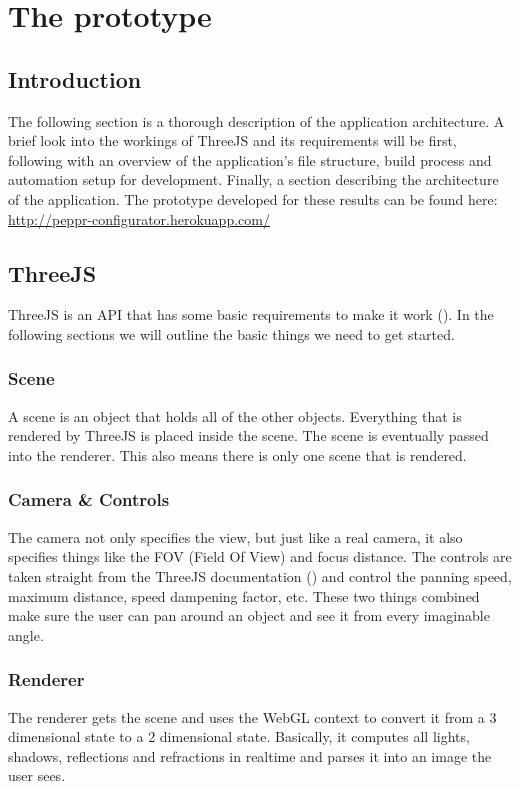 \section{The prototype}
\subsection{Introduction}
The following section is a thorough description of the application architecture. A brief look into the workings of ThreeJS and its requirements will be first, following with an overview of the application's file structure, build process and automation setup for development. Finally, a section describing the architecture of the application.
The prototype developed for these results can be found here: \url{http://peppr-configurator.herokuapp.com/}


\subsection{ThreeJS}
ThreeJS is an API that has some basic requirements to make it work (\cite{ThreeJSgettingStarted}). In the following sections we will outline the basic things we need to get started.
\subsubsection{Scene}
A scene is an object that holds all of the other objects. Everything that is rendered by ThreeJS is placed inside the scene. The scene is eventually passed into the renderer. This also means there is only one scene that is rendered.
\subsubsection{Camera \& Controls}
The camera not only specifies the view, but just like a real camera, it also specifies things like the FOV (Field Of View) and focus distance. The controls are taken straight from the ThreeJS documentation (\cite{ThreeJSgettingStarted}) and control the panning speed, maximum distance, speed dampening factor, etc. These two things combined make sure the user can pan around an object and see it from every imaginable angle.
\subsubsection{Renderer}
The renderer gets the scene and uses the WebGL context to convert it from a 3 dimensional state to a 2 dimensional state. Basically, it computes all lights, shadows, reflections and refractions in realtime and parses it into an image the user sees.
